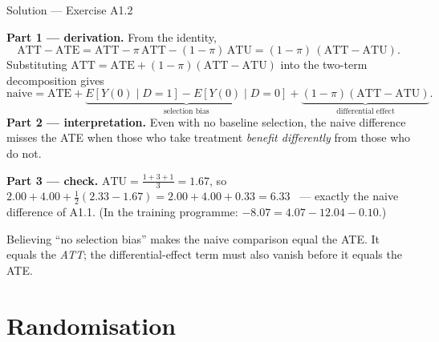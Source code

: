 \documentclass[aspectratio=169,11pt]{beamer}
\begin{document}
\begin{frame}{Solution --- Exercise A1.2}
\begin{solutionbox}
  \textbf{Part 1 --- derivation.} From the identity,
  \[
    \text{ATT}-\text{ATE} = \text{ATT} - \pi\,\text{ATT} - (1-\pi)\,\text{ATU}
    = (1-\pi)\,(\text{ATT}-\text{ATU}).
  \]
  Substituting $\text{ATT} = \text{ATE} + (1-\pi)(\text{ATT}-\text{ATU})$ into the
  two-term decomposition gives
  \[
    \text{naive} = \text{ATE} + \underbrace{E[Y(0)\mid D{=}1]-E[Y(0)\mid D{=}0]}_{\text{selection bias}}
    + \underbrace{(1-\pi)(\text{ATT}-\text{ATU})}_{\text{differential effect}} .
  \]
  \textbf{Part 2 --- interpretation.} Even with no baseline selection, the naive
  difference misses the ATE when those who take treatment \emph{benefit differently}
  from those who do not.

  \smallskip
  \textbf{Part 3 --- check.} $\text{ATU} = \tfrac{1+3+1}{3} = 1.67$, so
  $2.00 + 4.00 + \tfrac12(2.33-1.67) = 2.00 + 4.00 + 0.33 = 6.33$ \checkmark\ ---
  exactly the naive difference of A1.1. (In the training programme:
  $-8.07 = 4.07 - 12.04 - 0.10$.)
\end{solutionbox}
\begin{mistake}
  Believing ``no selection bias'' makes the naive comparison equal the ATE. It equals the
  \emph{ATT}; the differential-effect term must also vanish before it equals the ATE.
\end{mistake}
\end{frame}

\section{Randomisation}
\end{document}
